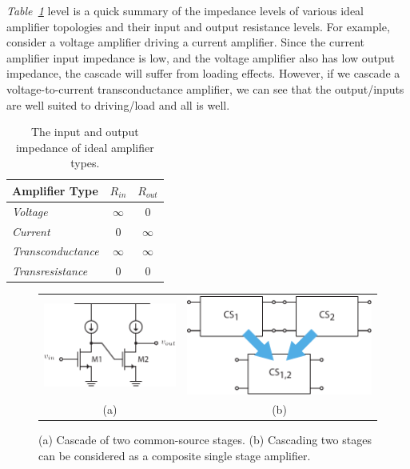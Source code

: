 \emph{Table~\ref{tab:imp}} level is a quick summary of the impedance levels of various ideal amplifier topologies and their input and output resistance levels.  For example, consider a voltage amplifier driving a current amplifier.  Since the current amplifier input impedance is low, and the voltage amplifier also has low output impedance, the cascade will suffer from loading effects.  However, if we cascade a voltage-to-current transconductance amplifier, we can see that the output/inputs are well suited to driving/load and all is well.
\begin{table}[H]
\centering
\setlength{\tabcolsep}{20pt}
\renewcommand{\arraystretch}{1.5}
\begin{tabular}{|l|c|c|}
    \hline
    \textbf{Amplifier Type}  &  $R_{in}$ &  $R_{out}$\\
    \hline
    \textit{Voltage} & $\infty$ & $0$\\
    \hline
    \textit{Current} & $0$  &  $\infty$\\
    \hline
    \textit{Transconductance} & $\infty$ & $\infty$\\
    \hline
    \textit{Transresistance} & $0$ & $0$\\
    \hline
\end{tabular}
\caption{The input and output impedance of ideal amplifier types.
\label{tab:imp}} 
\end{table}
\newpage
\begin{figure}[t]
\centering
\begin{tabular}{cc}
\includegraphics[scale=1.05]{cs_cascade_sch} &
\includegraphics[width=.5\columnwidth]{1cascade}\\
(a) & (b)\\
\end{tabular}
\caption{(a) Cascade of two common-source stages.  (b) Cascading two stages can be considered as a composite single stage amplifier.}
\label{fig:1cascade}
\end{figure}
